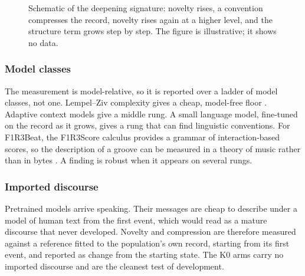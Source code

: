 \documentclass[11pt,a4paper]{article}
\newcommand{\Lc}{L}
\begin{document}
\begin{figure}[ht]
\centering
{}
\caption{Schematic of the deepening signature: novelty rises, a convention compresses the
record, novelty rises again at a higher level, and the structure term grows step by step. The
figure is illustrative; it shows no data.}
\label{fig:seesaw}
\end{figure}

\subsubsection{Model classes}
The measurement is model-relative, so it is reported over a ladder of model classes, not one.
Lempel--Ziv complexity gives a cheap, model-free floor \cite{lz}. Adaptive context models give a
middle rung. A small language model, fine-tuned on the record as it grows, gives a rung that can
find linguistic conventions. For F1R3Beat, the F1R3Score calculus provides a grammar of
interaction-based scores, so the description of a groove can be measured in a theory of music
rather than in bytes \cite{score-calc}. A finding is robust when it appears on several rungs.

\subsubsection{Imported discourse}
Pretrained models arrive speaking. Their messages are cheap to describe under a model of human
text from the first event, which would read as a mature discourse that never developed. Novelty
and compression are therefore measured against a reference fitted to the population's own record,
starting from its first event, and reported as change from the starting state. The K0 arms carry
no imported discourse and are the cleanest test of development.
\end{document}
